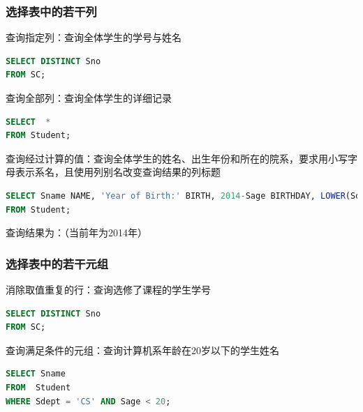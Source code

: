 \subsubsection{选择表中的若干列}
查询指定列：查询全体学生的学号与姓名
\begin{lstlisting}[language=sql]
SELECT DISTINCT Sno
FROM SC; 
\end{lstlisting}

查询全部列：查询全体学生的详细记录
\begin{lstlisting}[language=sql]
SELECT  *
FROM Student;
\end{lstlisting}

查询经过计算的值：查询全体学生的姓名、出生年份和所在的院系，要求用小写字母表示系名，且使用列别名改变查询结果的列标题
\begin{lstlisting}[language=sql]
SELECT Sname NAME, 'Year of Birth:' BIRTH, 2014-Sage BIRTHDAY, LOWER(Sdept) DEPARTMENT
FROM Student;
\end{lstlisting}

查询结果为：（当前年为2014年）
\begin{table}[H]
    \vspace{-0.5em}
    \centering
    \vspace{-1em}
\end{table}

\subsubsection{选择表中的若干元组}
消除取值重复的行：查询选修了课程的学生学号
\begin{lstlisting}[language=sql]
SELECT DISTINCT Sno
FROM SC; 
\end{lstlisting}

查询满足条件的元组：查询计算机系年龄在20岁以下的学生姓名
\begin{lstlisting}[language=sql]
SELECT Sname
FROM  Student
WHERE Sdept = 'CS' AND Sage < 20;
\end{lstlisting}

